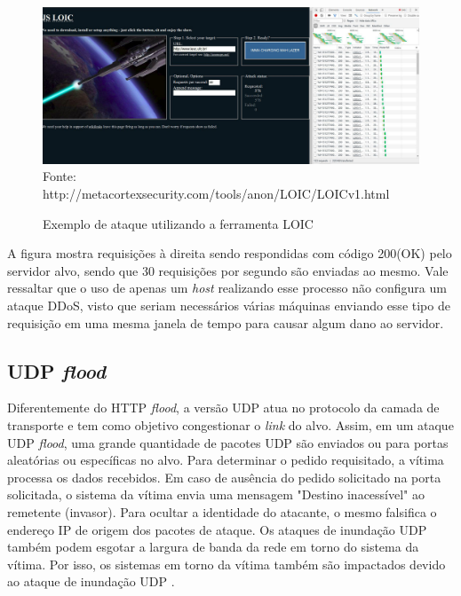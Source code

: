  \begin{figure}[ht]
 	\centering
 	\caption{Exemplo de ataque utilizando a ferramenta LOIC }
 	\includegraphics[width=1\textwidth]{figs/loic.pdf}\\
 	{Fonte: http://metacortexsecurity.com/tools/anon/LOIC/LOICv1.html}
 	\label{fig:loic}
 \end{figure} 
 
 A figura mostra requisições à direita sendo respondidas com código 200(OK) pelo servidor alvo, sendo que 30 requisições por segundo são enviadas ao mesmo. Vale ressaltar que o uso de apenas um \textit{host} realizando  esse processo não configura um ataque DDoS, visto que seriam necessários várias máquinas enviando esse tipo de requisição em uma mesma janela de tempo para causar algum dano ao servidor.
 
 \subsection{UDP \textit{flood}}
 
 Diferentemente do HTTP \textit{flood}, a versão UDP atua no protocolo da camada de transporte e tem como objetivo congestionar o \textit{link} do alvo. Assim, em um ataque UDP \textit{flood}, uma grande quantidade de pacotes UDP são enviados ou para portas aleatórias ou específicas no alvo. Para determinar o pedido requisitado, a vítima processa os dados recebidos. Em caso de ausência do pedido solicitado na porta solicitada, o sistema da vítima envia uma mensagem "Destino inacessível" ao remetente (invasor). Para ocultar a identidade do atacante, o mesmo falsifica o endereço IP de origem dos pacotes de ataque. Os ataques de inundação UDP também podem esgotar a largura de banda da rede em torno do sistema da vítima. Por isso, os sistemas em torno da vítima também são impactados devido ao ataque de inundação UDP \cite{xiaoming2010denial}. 
 
 
